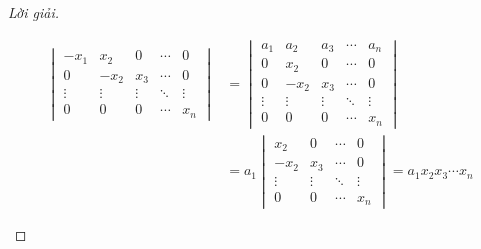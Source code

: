 \documentclass[class=nhvh-linear-algebra,crop=false]{standalone}
\begin{document}
\begin{proof}[Lời giải]
\begin{enumerate}[label = (\alph*)]
\begin{align*}
\begin{vmatrix}
				      -x_{1} & x_{2}  & 0      & \cdots & 0      \\
				      0      & -x_{2} & x_{3}  & \cdots & 0      \\
				      \vdots & \vdots & \vdots & \ddots & \vdots \\
				      0      & 0      & 0      & \cdots & x_{n}
			      \end{vmatrix}
			       & =
			      \begin{vmatrix}
				      a_{1}  & a_{2}  & a_{3}  & \cdots & a_{n}  \\
				      0      & x_{2}  & 0      & \cdots & 0      \\
				      0      & -x_{2} & x_{3}  & \cdots & 0      \\
				      \vdots & \vdots & \vdots & \ddots & \vdots \\
				      0      & 0      & 0      & \cdots & x_{n}
			      \end{vmatrix}             \\
			       & = a_{1} \begin{vmatrix}
				                 x_{2}  & 0      & \cdots & 0      \\
				                 -x_{2} & x_{3}  & \cdots & 0      \\
				                 \vdots & \vdots & \ddots & \vdots \\
				                 0      & 0      & \cdots & x_{n}
			                 \end{vmatrix} = a_{1}x_{2}x_{3}\cdots x_{n}
		      \end{align*}


\end{enumerate}
\end{proof}
\end{document}
